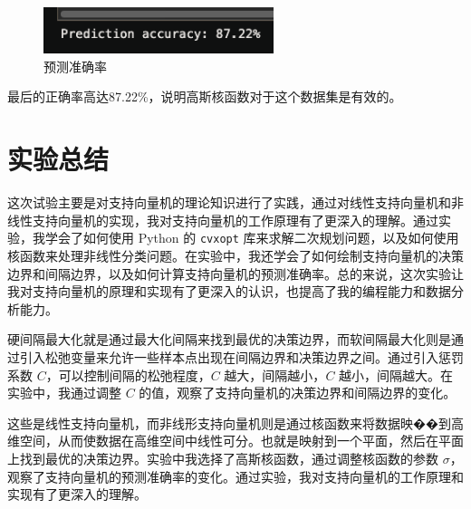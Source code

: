 \documentclass[12pt,a4paper,oneside]{article}
\begin{document}
\begin{figure}[H]
    \centering
    \includegraphics[width=0.6\textwidth]{image/10.png}
    \caption{预测准确率}
\end{figure}

最后的正确率高达87.22\%，说明高斯核函数对于这个数据集是有效的。
\section{实验总结}
\qquad 这次试验主要是对支持向量机的理论知识进行了实践，通过对线性支持向量机和非线性支持向量机的实现，我对支持向量机的工作原理有了更深入的理解。通过实验，我学会了如何使用 Python 的 \texttt{cvxopt} 库来求解二次规划问题，以及如何使用核函数来处理非线性分类问题。在实验中，我还学会了如何绘制支持向量机的决策边界和间隔边界，以及如何计算支持向量机的预测准确率。总的来说，这次实验让我对支持向量机的原理和实现有了更深入的认识，也提高了我的编程能力和数据分析能力。

硬间隔最大化就是通过最大化间隔来找到最优的决策边界，而软间隔最大化则是通过引入松弛变量来允许一些样本点出现在间隔边界和决策边界之间。通过引入惩罚系数 $C$，可以控制间隔的松弛程度，$C$ 越大，间隔越小，$C$ 越小，间隔越大。在实验中，我通过调整 $C$ 的值，观察了支持向量机的决策边界和间隔边界的变化。

这些是线性支持向量机，而非线形支持向量机则是通过核函数来将数据映��到高维空间，从而使数据在高维空间中线性可分。也就是映射到一个平面，然后在平面上找到最优的决策边界。实验中我选择了高斯核函数，通过调整核函数的参数 $\sigma$，观察了支持向量机的预测准确率的变化。通过实验，我对支持向量机的工作原理和实现有了更深入的理解。
\end{document}
